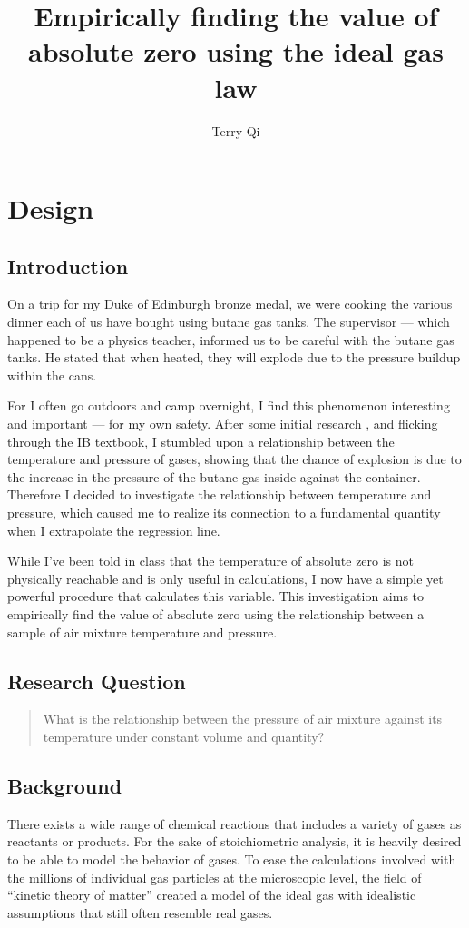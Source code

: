 \documentclass[a4paper,12pt]{article}
\title{Empirically finding the value of absolute zero using the ideal gas law}
\author{Terry Qi}
\begin{document}
\maketitle

\section{Design}
\subsection{Introduction}
On a trip for my Duke of Edinburgh bronze medal, we were cooking the various dinner each of us have bought using butane gas tanks. The supervisor --- which happened to be a physics teacher, informed us to be careful with the butane gas tanks. He stated that when heated, they will explode due to the pressure buildup within the cans.

For I often go outdoors and camp overnight, I find this phenomenon interesting and important --- for my own safety. After some initial research \parencite{lpg}, and flicking through the IB textbook, I stumbled upon a relationship between the temperature and pressure of gases, showing that the chance of explosion is due to the increase in the pressure of the butane gas inside against the container. Therefore I decided to investigate the relationship between temperature and pressure, which caused me to realize its connection to a fundamental quantity when I extrapolate the regression line.

While I've been told in class that the temperature of absolute zero is not physically reachable and is only useful in calculations, I now have a simple yet powerful procedure that calculates this variable. This investigation aims to empirically find the value of absolute zero using the relationship between a sample of air mixture temperature and pressure.


\subsection{Research Question}
\begin{quote}
    What is the relationship between the pressure of air mixture against its temperature under constant volume and quantity?
\end{quote}

\subsection{Background}
There exists a wide range of chemical reactions that includes a variety of gases as reactants or products. For the sake of stoichiometric analysis, it is heavily desired to be able to model the behavior of gases. To ease the calculations involved with the millions of individual gas particles at the microscopic level, the field of ``kinetic theory of matter'' created a model of the ideal gas with idealistic assumptions that still often resemble real gases.
\end{document}
